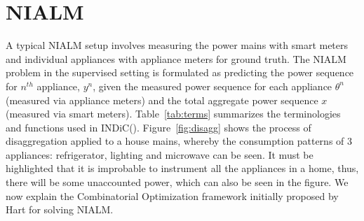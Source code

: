 \documentclass[conference]{IEEEtran}
\newcommand{\figref}[1]{Figure~\ref{#1}}
\newcommand{\tabref}[1]{Table~\ref{#1}}
\newcommand{\indic}{INDiC}
\begin{document}



\section{NIALM}
\noindent A typical NIALM setup involves measuring the power mains with smart meters and individual appliances with appliance meters for ground truth. The NIALM problem in the supervised setting is formulated as predicting the power sequence for $n^{th}$ appliance, $y^n$, given the measured power sequence for each appliance $\theta^n$ (measured via appliance meters) and the total aggregate power sequence $x$ (measured via smart meters). \tabref{tab:terms} summarizes the terminologies and functions used in \indic (\cite{redd,parson2012_aaai,hart}). \figref{fig:disagg} shows the process of disaggregation applied to a house mains, whereby the consumption patterns of 3 appliances: refrigerator, lighting and microwave can be seen. It must be highlighted that it is improbable to instrument all the appliances in a home, thus, there will be some unaccounted power, which can also be seen in the figure. We now explain the Combinatorial Optimization framework initially proposed by Hart \cite{hart} for solving NIALM.
\end{document}
